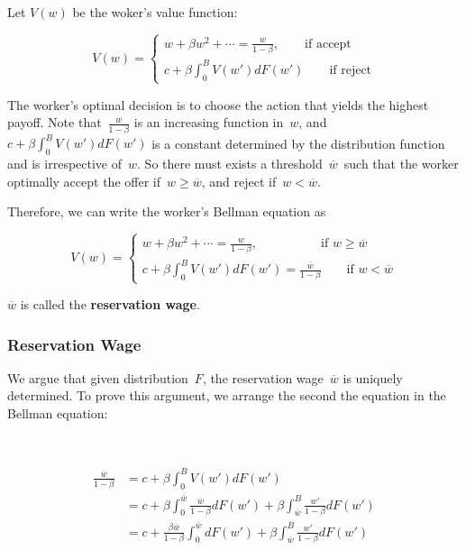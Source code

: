 \documentclass[10pt,a4]{article}
\begin{document}
\par\null

Let $V(w)$ be the woker's value function:

\[
V(w) = \begin{cases}
w + \beta w^2 +\cdots = \frac{w}{1-\beta}, \qquad\textrm{if accept}\\
c + \beta \int_0^B V(w') dF(w') \qquad\textrm{if reject}
\end{cases}
\]

The worker's optimal decision is to choose the action that yields the
highest payoff. Note that~\(\frac{w}{1-\beta}\) is an increasing function
in~\(w\), and~\(c + \beta \int_0^B V(w') dF(w')\) is a constant determined
by the distribution function and is irrespective of~\(w\).
So there must exists a threshold~\(\overline{w}\)~such that the worker
optimally accept the offer if~\(w \ge \overline{w}\), and reject
if~\(w < \overline{w}\).

Therefore, we can write the worker's Bellman equation as

\[
V(w) = \begin{cases}
w + \beta w^2 +\cdots = \frac{w}{1-\beta}, \quad\qquad\qquad\textrm{if }w \ge \overline{w}\\
c + \beta \int_0^B V(w') dF(w') = \frac{\overline{w}}{1-\beta} \qquad\textrm{if }w < \overline{w}
\end{cases}
\]

\(\overline{w}\) is called the \textbf{reservation wage}.

\par\null

\subsubsection{Reservation Wage}

{\label{160406}}

We argue that given distribution~\(F\), the reservation
wage~\(\overline{w}\) is uniquely determined. To prove this argument,
we arrange the second the equation in the Bellman equation:

~

\[
\begin{aligned}
 \frac{\overline{w}}{1-\beta} &= c + \beta \int_0^B V(w') dF(w') \\
 &= c + \beta \int_0^{\overline{w}} \frac{\overline{w}}{1-\beta} dF(w') + \beta \int_{\overline{w}}^{B} \frac{w'}{1-\beta} dF(w') \\
 &= c + \frac{\beta\overline{w}}{1-\beta} \int_0^{\overline{w}}dF(w') + \beta \int_{\overline{w}}^{B} \frac{w'}{1-\beta} dF(w')
\end{aligned}
\]
\end{document}

